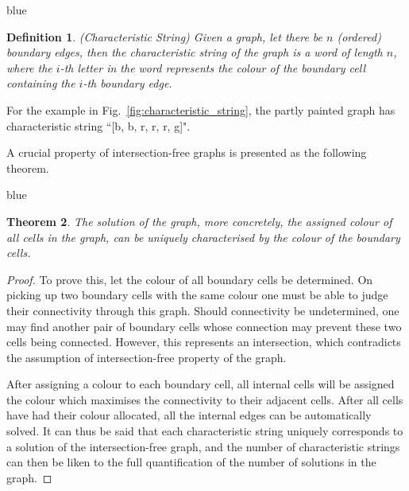 \documentclass[journal]{IEEEtran}
\newtheorem{theorem}{Theorem}
\newtheorem{definition}[theorem]{Definition}
\begin{document}
\begin{color}{blue}
\begin{definition}
(Characteristic String) Given a graph, let there be $n$ (ordered) boundary edges, then the characteristic string of the graph is a word of length $n$, where the $i$-th letter in the word represents the colour of the boundary cell containing the $i$-th boundary edge. 
\end{definition}

For the example in Fig.~\ref{fig:characteristic_string}, the partly painted graph has characteristic string ``[b, b, r, r, r, g]". 
\end{color}
A crucial property of intersection-free graphs is presented as the following theorem.
\begin{color}{blue}
\begin{theorem}
The solution of the graph, more concretely, the assigned colour of all cells in the graph, can be uniquely characterised by the colour of the boundary cells. 
\end{theorem}
\end{color}
\begin{proof}
To prove this, let the colour of all boundary cells be determined. On picking up two boundary cells with the same colour one must be able to judge their connectivity through this graph. Should connectivity be undetermined, one may find another pair of boundary cells whose connection may prevent these two cells being connected. However, this represents an intersection, which contradicts the assumption of intersection-free property of the graph. 

After assigning a colour to each boundary cell, all internal cells will be assigned the colour which maximises the connectivity to their adjacent cells. 
After all cells have had their colour allocated, all the internal edges can be  automatically solved. 
It can thus be said that each characteristic string uniquely corresponds to a solution of the intersection-free graph, 
and the number of characteristic strings can then be liken to the full quantification of the number of solutions in the graph. 
\end{proof}
\end{document}
